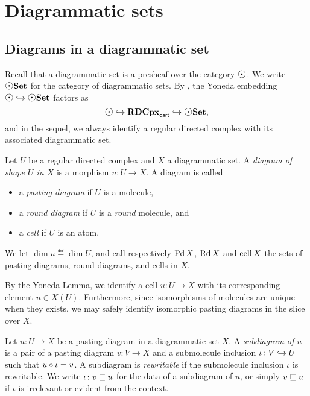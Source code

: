 \section{Diagrammatic sets} \label{sec:diagrammatic}

\subsection{Diagrams in a diagrammatic set}

Recall that a diagrammatic set is a presheaf over the category \( \atom \).
We write \( \dgmSet \) for the category of diagrammatic sets.
By \cite[Lemma 2.5]{chanavat2024htpy}, the Yoneda embedding \( \atom \incl \dgmSet \) factors as
\begin{equation*}
    \atom \incl \rdcpxcart \incl \dgmSet,
\end{equation*} 
and in the sequel, we always identify a regular directed complex with its associated diagrammatic set.

\begin{dfn} 
    Let \( U \) be a regular directed complex and \( X \) a diagrammatic set.
    A \emph{diagram of shape \( U \) in \( X \)} is a morphism \( u \colon U \to X \).
    A diagram is called
    \begin{itemize}
        \item a \emph{pasting diagram} if \( U \) is a molecule,
        \item a \emph{round diagram} if \( U \) is a \emph{round} molecule, and
        \item a \emph{cell} if \( U \) is an atom.
    \end{itemize}
    We let \( \dim u \eqdef \dim U \), and call respectively \( \operatorname{Pd} X \), \( \operatorname{Rd} X \) and \( \operatorname{cell} X \) the sets of pasting diagrams, round diagrams, and cells in \( X \).
\end{dfn}

\begin{rmk}
    By the Yoneda Lemma, we identify a cell \( u \colon U \to X \) with its corresponding element \( u \in X(U) \).
    Furthermore, since isomorphisms of molecules are unique when they exists, we may safely identify isomorphic pasting diagrams in the slice over \( X \).
\end{rmk}

\begin{dfn} [Subdiagram]
    Let \( u \colon U \to X \) be a pasting diagram in a diagrammatic set \( X \).
    A \emph{subdiagram of \( u \)} is a pair of a pasting diagram \( v \colon V \to X \) and a submolecule inclusion \( \iota \colon V \hookrightarrow U \) such that \( u \circ \iota = v \).
    A subdiagram is \emph{rewritable} if the submolecule inclusion \( \iota \) is rewritable.
    We write \( \iota \colon v \sqsubseteq u \) for the data of a subdiagram of \( u \), or simply \( v \sqsubseteq u \) if \( \iota \) is irrelevant or evident from the context. 
\end{dfn}

